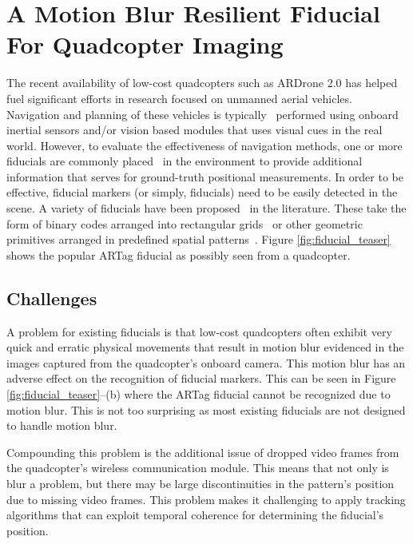 \chapter[Blur Resilient Fiducials]{A Motion Blur Resilient Fiducial For
Quadcopter Imaging}
\label{ch:fiducial}

The recent availability of low-cost quadcopters such as ARDrone 2.0 has helped 
fuel significant efforts in research focused on unmanned aerial
vehicles. Navigation and planning
of these vehicles is typically~\cite{Davison:2007,Engel12,Engel13}
performed using onboard inertial sensors and/or vision based modules
that uses visual cues in the real world. However, to evaluate the
effectiveness of navigation methods, one or more fiducials are commonly
placed~\cite{Bosnak:2012,Lim09,Klopschitz:2007}
 in the environment to provide additional information that
serves for ground-truth positional measurements.
In order to be effective, fiducial markers (or simply, fiducials) need
to be easily detected in the scene. A variety of fiducials have
been proposed~\cite{NaimarkF02,ARToolkit02,Fiala05,Pitag13,runetag11}
in the literature.  These take the form of binary codes arranged into
rectangular grids~\cite{ARToolkit02,Fiala05} or other geometric
primitives arranged in predefined spatial
patterns~\cite{NaimarkF02,Pitag13,runetag11}.  Figure \ref{fig:fiducial_teaser}
shows the popular ARTag \cite{Fiala05} fiducial as possibly seen from
a quadcopter.

\section{Challenges}
\label{sec:intro}
 A problem for existing fiducials is that low-cost
quadcopters often exhibit very quick and erratic physical movements
that result in motion blur evidenced in the images captured from the quadcopter's onboard
camera. This motion blur has an adverse effect on the recognition of fiducial
markers. This can be seen in Figure \ref{fig:fiducial_teaser}--(b) where the
ARTag fiducial cannot be recognized due to motion blur. This is not
too surprising as most existing fiducials are not designed to handle
motion blur.

Compounding this problem is the additional issue of dropped video
frames from the quadcopter's wireless communication module. This means
that not only is blur a problem, but there may be large
discontinuities in the pattern's position due to missing video
frames. This problem makes it challenging to apply tracking algorithms that can
exploit temporal coherence for determining the fiducial's position.

